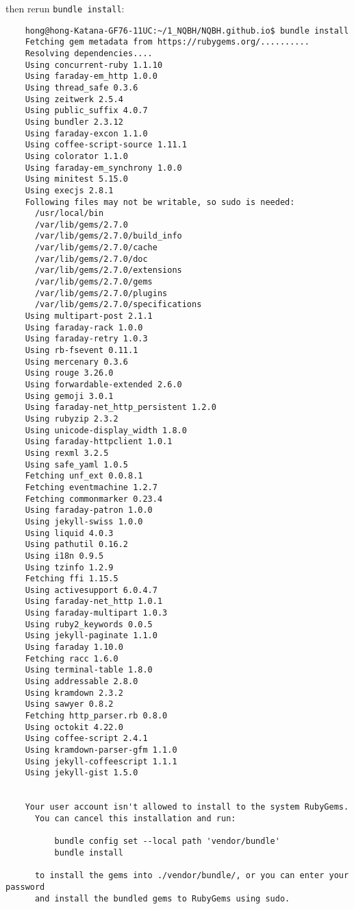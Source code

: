\documentclass{article}
\numberwithin{equation}{section}
\begin{document}
then rerun \texttt{bundle install}:
\begin{verbatim}
	hong@hong-Katana-GF76-11UC:~/1_NQBH/NQBH.github.io$ bundle install
	Fetching gem metadata from https://rubygems.org/..........
	Resolving dependencies....
	Using concurrent-ruby 1.1.10
	Using faraday-em_http 1.0.0
	Using thread_safe 0.3.6
	Using zeitwerk 2.5.4
	Using public_suffix 4.0.7
	Using bundler 2.3.12
	Using faraday-excon 1.1.0
	Using coffee-script-source 1.11.1
	Using colorator 1.1.0
	Using faraday-em_synchrony 1.0.0
	Using minitest 5.15.0
	Using execjs 2.8.1
	Following files may not be writable, so sudo is needed:
	  /usr/local/bin
	  /var/lib/gems/2.7.0
	  /var/lib/gems/2.7.0/build_info
	  /var/lib/gems/2.7.0/cache
	  /var/lib/gems/2.7.0/doc
	  /var/lib/gems/2.7.0/extensions
	  /var/lib/gems/2.7.0/gems
	  /var/lib/gems/2.7.0/plugins
	  /var/lib/gems/2.7.0/specifications
	Using multipart-post 2.1.1
	Using faraday-rack 1.0.0
	Using faraday-retry 1.0.3
	Using rb-fsevent 0.11.1
	Using mercenary 0.3.6
	Using rouge 3.26.0
	Using forwardable-extended 2.6.0
	Using gemoji 3.0.1
	Using faraday-net_http_persistent 1.2.0
	Using rubyzip 2.3.2
	Using unicode-display_width 1.8.0
	Using faraday-httpclient 1.0.1
	Using rexml 3.2.5
	Using safe_yaml 1.0.5
	Fetching unf_ext 0.0.8.1
	Fetching eventmachine 1.2.7
	Fetching commonmarker 0.23.4
	Using faraday-patron 1.0.0
	Using jekyll-swiss 1.0.0
	Using liquid 4.0.3
	Using pathutil 0.16.2
	Using i18n 0.9.5
	Using tzinfo 1.2.9
	Fetching ffi 1.15.5
	Using activesupport 6.0.4.7
	Using faraday-net_http 1.0.1
	Using faraday-multipart 1.0.3
	Using ruby2_keywords 0.0.5
	Using jekyll-paginate 1.1.0
	Using faraday 1.10.0
	Fetching racc 1.6.0
	Using terminal-table 1.8.0
	Using addressable 2.8.0
	Using kramdown 2.3.2
	Using sawyer 0.8.2
	Fetching http_parser.rb 0.8.0
	Using octokit 4.22.0
	Using coffee-script 2.4.1
	Using kramdown-parser-gfm 1.1.0
	Using jekyll-coffeescript 1.1.1
	Using jekyll-gist 1.5.0
	
	
	Your user account isn't allowed to install to the system RubyGems.
	  You can cancel this installation and run:
	
	      bundle config set --local path 'vendor/bundle'
	      bundle install
	
	  to install the gems into ./vendor/bundle/, or you can enter your password
	  and install the bundled gems to RubyGems using sudo.
	

\end{verbatim}
\end{document}
